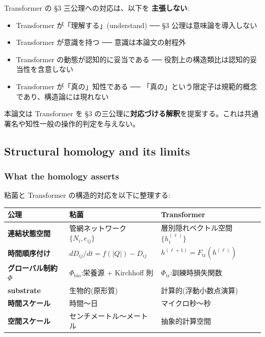 Transformer の \S{}3 三公理への対応は、以下を \textbf{主張しない}:

\begin{itemize}
\item Transformer が「理解する」(understand) ── \S{}3 公理は意味論を導入しない
\item Transformer が意識を持つ ── 意識は本論文の射程外
\item Transformer の動態が認知的に妥当である ── 役割上の構造類比は認知的妥当性を含意しない
\item Transformer が「真の」知性である ── 「真の」という限定子は規範的概念であり、構造論には現れない
\end{itemize}

本論文は Transformer を \S{}3 の三公理に\textbf{対応づける解釈}を提案する。これは共通署名や知性一般の操作的判定を与えない。

\subsection{Structural homology and its limits}


\subsubsection{What the homology asserts}


粘菌と Transformer の構造的対応を以下に整理する:

\begin{table}[H]
\centering
\small
\begin{tabularx}{\textwidth}{>{\raggedright\arraybackslash}X>{\raggedright\arraybackslash}X>{\raggedright\arraybackslash}X}
\toprule
公理 & 粘菌 & Transformer \\
\midrule
\textbf{連結状態空間} & 管網ネットワーク $\{N_i, e_{ij}\}$ & 層別隠れベクトル空間 $\{h^{(\ell)}_i\}$ \\
\textbf{時間順序付け} & $dD_{ij}/dt = f(\lvert Q\rvert) - D_{ij}$ & $h^{(\ell+1)} = F_\text{tr}(h^{(\ell)})$ \\
\textbf{グローバル制約 $\Phi$} & $\Phi_\text{bio}$:栄養源 + Kirchhoff 則 & $\Phi_\text{tr}$:訓練時損失関数 \\
\textbf{substrate} & 生物的(原形質) & 計算的(浮動小数点演算) \\
\textbf{時間スケール} & 時間〜日 & マイクロ秒〜秒 \\
\textbf{空間スケール} & センチメートル〜メートル & 抽象的計算空間 \\
\bottomrule
\end{tabularx}
\end{table}


